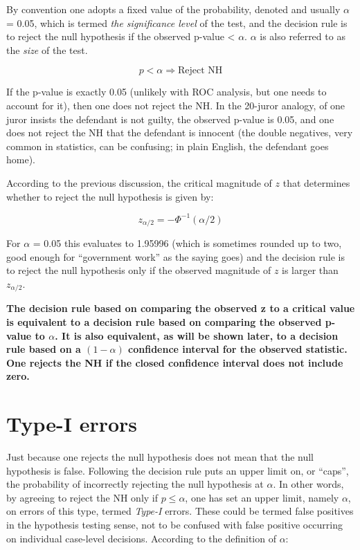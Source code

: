 \documentclass[
]{book}
\begin{document}
By convention one adopts a fixed value of the probability, denoted and usually \(\alpha\) = 0.05, which is termed \emph{the significance level} of the test, and the decision rule is to reject the null hypothesis if the observed p-value \textless{} \(\alpha\). \(\alpha\) is also referred to as the \emph{size} of the test.

\begin{equation*} 
p < \alpha \Rightarrow \text{Reject NH}
\end{equation*}

If the p-value is exactly 0.05 (unlikely with ROC analysis, but one needs to account for it), then one does not reject the NH. In the 20-juror analogy, of one juror insists the defendant is not guilty, the observed p-value is 0.05, and one does not reject the NH that the defendant is innocent (the double negatives, very common in statistics, can be confusing; in plain English, the defendant goes home).

According to the previous discussion, the critical magnitude of \(z\) that determines whether to reject the null hypothesis is given by:

\begin{equation*} 
z_{\alpha / 2}=-\Phi^{-1}\left ( {\alpha/2} \right )
\end{equation*}

For \(\alpha\) = 0.05 this evaluates to 1.95996 (which is sometimes rounded up to two, good enough for ``government work'' as the saying goes) and the decision rule is to reject the null hypothesis only if the observed magnitude of \(z\) is larger than \(z_{\alpha/2}\).

\textbf{The decision rule based on comparing the observed z to a critical value is equivalent to a decision rule based on comparing the observed p-value to \(\alpha\). It is also equivalent, as will be shown later, to a decision rule based on a \(\left ( 1-\alpha \right )\) confidence interval for the observed statistic. One rejects the NH if the closed confidence interval does not include zero.}

\hypertarget{type-i-errors}{%
\section{Type-I errors}\label{type-i-errors}}

Just because one rejects the null hypothesis does not mean that the null hypothesis is false. Following the decision rule puts an upper limit on, or ``caps'', the probability of incorrectly rejecting the null hypothesis at \(\alpha\). In other words, by agreeing to reject the NH only if \(p \leq \alpha\), one has set an upper limit, namely \(\alpha\), on errors of this type, termed \emph{Type-I} errors. These could be termed false positives in the hypothesis testing sense, not to be confused with false positive occurring on individual case-level decisions. According to the definition of \(\alpha\):
\end{document}
